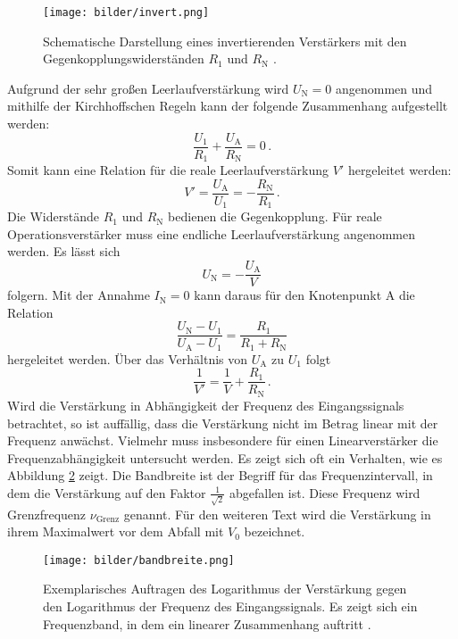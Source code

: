   \begin{figure}[H]
    \centering
    \texttt{[image: bilder/invert.png]}
    \caption{Schematische Darstellung eines invertierenden Verstärkers mit den Gegenkopplungswiderständen $R_1$ und $R_\text{N}$ \cite{anleitung}.}
    \label{invert}
  \end{figure}

Aufgrund der sehr großen Leerlaufverstärkung wird $U_\text{N}=0$ angenommen und mithilfe der Kirchhoffschen Regeln kann der folgende Zusammenhang aufgestellt werden:
\begin{equation}
  \frac{U_1}{R_1}+\frac{U_\text{A}}{R_\text{N}}=0\,.
\end{equation}
  Somit kann eine Relation für die reale Leerlaufverstärkung $V'$ hergeleitet werden:
  \begin{equation}
    V'=\frac{U_\text{A}}{U_\text{1}}=-\frac{R_\text{N}}{R_1}\,.
    \label{eq:V_linear}
  \end{equation}
  Die Widerstände $R_1$ und $R_\text{N}$ bedienen die Gegenkopplung. Für reale Operationsverstärker muss eine endliche Leerlaufverstärkung angenommen werden. Es lässt sich
  \begin{equation}
    U_\text{N}=-\frac{U_\text{A}}{V}
  \end{equation}
  folgern.
  Mit der Annahme $I_\text{N}=0$ kann daraus für den Knotenpunkt A die Relation
  \begin{equation}
    \frac{U_\text{N}-U_1}{U_\text{A}-U_1}=\frac{R_1}{R_1+R_\text{N}}
  \end{equation}
  hergeleitet werden. Über das Verhältnis von $U_\text{A}$ zu $U_1$ folgt
  \begin{equation}
    \frac{1}{V'}=\frac{1}{V}+\frac{R_1}{R_\text{N}}\,.
  \end{equation}
  Wird die Verstärkung in Abhängigkeit der Frequenz des Eingangssignals betrachtet, so ist auffällig, dass die Verstärkung nicht im Betrag linear mit der Frequenz anwächst. Vielmehr muss insbesondere für einen Linearverstärker die Frequenzabhängigkeit untersucht werden. Es zeigt sich oft ein Verhalten, wie es Abbildung \ref{abb:bandbreite} zeigt.
  Die Bandbreite ist der Begriff für das Frequenzintervall, in dem die Verstärkung auf den Faktor $\frac{1}{\sqrt{2}}$ abgefallen ist. Diese Frequenz wird Grenzfrequenz $\nu_\text{Grenz}$ genannt. Für den weiteren Text wird die Verstärkung in ihrem Maximalwert vor dem Abfall mit $V_0$ bezeichnet.
  \begin{figure}[H]
    \centering
    \texttt{[image: bilder/bandbreite.png]}
    \caption{Exemplarisches Auftragen des Logarithmus der Verstärkung gegen den Logarithmus der Frequenz des Eingangssignals. Es zeigt sich ein Frequenzband, in dem ein linearer Zusammenhang auftritt \cite{anleitung}.}
    \label{abb:bandbreite}
  \end{figure}

